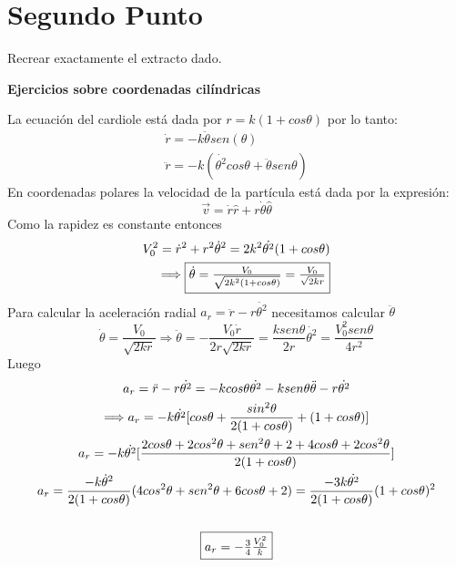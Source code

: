 \documentclass[10pt,onecolumn,letterpaper]{article}
\begin{document}
\section{Segundo Punto} 
Recrear exactamente el extracto dado. \\
\begin{center}
\textbf{Ejercicios sobre coordenadas cilíndricas}
\end{center}
La ecuación del cardiole está dada por $r=k(1+cos\theta)$ por lo tanto:
\begin{eqnarray*}
\dot{r}=-k\ddot{\theta}sen(\theta) \\
\ddot{r}= -k(\dot{\theta ^{2}} cos\theta + \ddot{\theta}sen\theta)
\end{eqnarray*}
En  coordenadas polares la velocidad de la partícula está dada por la expresión:
\begin{equation*}
\vec{v}=\dot{r}\hat{r}+r\dot{\theta} \hat{\theta}
\end{equation*}
Como la rapidez es constante entonces
\begin{eqnarray*}
V_0^{2}=\dot{r}^{2}+r^{2}\dot{\theta}^{2}=2k^{2}\dot{\theta^{2}}(1+cos\theta) \\
\Longrightarrow \fbox{$\dot{\theta} = \frac{V_0}{\sqrt{2k^{2}(1+cos\theta)}}=\frac{V_0}{\sqrt{2kr}}$}
\end{eqnarray*}
Para calcular la aceleración radial $a_r=\ddot{r}-r\ddot{\theta^{2}}$ necesitamos calcular $\ddot{\theta}$
\begin{equation*}
\dot{\theta}=\frac{V_0}{\sqrt{2kr}}\Longrightarrow \ddot{\theta}=-\frac{V_0\dot{r}}{2r\sqrt{2kr}}= \frac{ksen\theta}{2r}\dot{\theta^{2}}=\frac{V_0^{2}sen\theta}{4r^{2}}
\end{equation*}
Luego
\begin{gather*}
a_r=\ddot{r}-r\dot{\theta^{2}}=-kcos\theta\dot{\theta^{2}}- ksen\theta\ddot{\theta}-r\dot{\theta^{2}}\\
\Longrightarrow a_r=-k\dot{\theta^{2}}[cos\theta +\frac{sin^{2}\theta}{2(1+cos\theta)}+(1+cos\theta)]\\
a_r=-k\dot{\theta^{2}}[\frac{2cos\theta+2cos^{2}\theta+ sen^{2}\theta +2+4cos\theta+2cos^{2}\theta}{2(1+cos\theta)}]\\
a_r=\frac{-k\dot{\theta}^{2}}{2(1+cos\theta)}(4cos^{2}\theta + sen^{2}\theta +6cos\theta + 2)=\frac{-3k\dot{\theta^{2}}}{2(1+cos\theta)}(1+cos\theta)^{2}\\ 
\\
\fbox{$a_r=-\frac{3}{4}\frac{V_0^{2}}{k}$}
\end{gather*}
\end{document}
